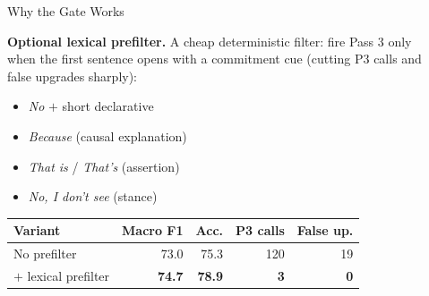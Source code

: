 \documentclass[final]{beamer}
\newlength{\sepwidth}\setlength{\sepwidth}{0.025\paperwidth}
\newlength{\halfW}\setlength{\halfW}{0.4625\paperwidth}
\newcommand{\separatorcolumn}{\begin{column}{\sepwidth}\end{column}}
\begin{document}
\begin{frame}[t]
\begin{columns}[t]
\begin{column}{\halfW}
\begin{block}{Why the Gate Works}
    \par\smallskip
    \textbf{Optional lexical prefilter.} A cheap deterministic filter: fire Pass 3 only when the
    first sentence opens with a commitment cue (cutting P3 calls and false upgrades sharply):
    \par\vspace{-3pt}
    \begin{minipage}[t]{0.44\linewidth}
      \vspace{0pt}
      \begin{itemize}\setlength\itemsep{1pt}\setlength\topsep{0pt}\setlength\partopsep{0pt}
        \item \emph{No} $+$ short declarative
        \item \emph{Because} (causal explanation)
        \item \emph{That is} / \emph{That's} (assertion)
        \item \emph{No, I don't see} (stance)
      \end{itemize}
    \end{minipage}\hfill
    \begin{minipage}[t]{0.52\linewidth}
      \vspace{0pt}\centering\fontsize{20}{23.5}\selectfont
      \begin{tabular}{@{}lrrrr@{}}
        \toprule
        \textbf{Variant} & \textbf{Macro F1} & \textbf{Acc.} & \textbf{P3 calls} & \textbf{False up.} \\
        \midrule
        No prefilter & 73.0 & 75.3 & 120 & 19 \\
        \rowcolor{lavender}$+$ lexical prefilter & \textbf{74.7} & \textbf{78.9} & \textbf{3} & \textbf{0} \\
        \bottomrule
      \end{tabular}
    \end{minipage}
  \end{block}
\end{column}
\separatorcolumn
\end{columns}


\end{frame}
\end{document}
